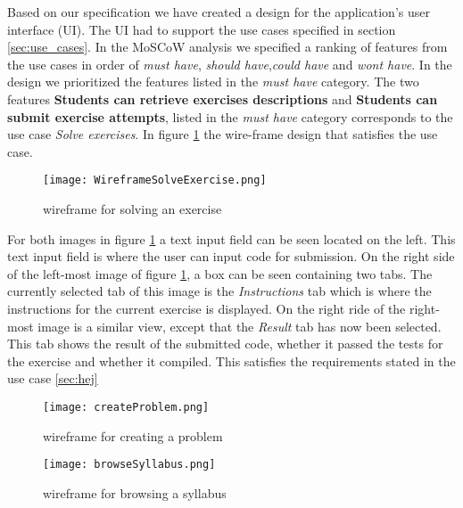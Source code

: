 
Based on our specification we have created a design for the application's user interface (UI). The UI had to support the use cases specified in section \ref*{sec:use_cases}. In the MoSCoW analysis we specified a ranking of features from the use cases in order of \textit{must have}, \textit{should have},\textit{could have} and \textit{wont have}. In the design we prioritized the features listed in the \textit{must have} category. The two features \textbf{Students can retrieve exercises descriptions} and \textbf{Students can submit exercise attempts}, listed in the \textit{must have} category corresponds to the use case \textit{Solve exercises}.
In figure \ref{fig:wfExercise} the wire-frame design that satisfies the use case.
\begin{figure}[H]
	\texttt{[image: WireframeSolveExercise.png]}
	\centering
	\caption{wireframe for solving an exercise}
	\label{fig:wfExercise}
\end{figure}

For both images in figure \ref{fig:wfExercise} a text input field can be seen located on the left. This text input field is where the user can input code for submission. On the right side of the left-most image of figure \ref{fig:wfExercise}, a box can be seen containing two tabs. The currently selected tab of this image is the \textit{Instructions} tab which is where the instructions for the current exercise is displayed. On the right ride of the right-most image is a similar view, except that the \textit{Result} tab has now been selected. This tab shows the result of the submitted code, whether it passed the tests for the exercise and whether it compiled. This satisfies the requirements stated in the use case \ref{sec:hej}
\begin{figure}[H]
	\texttt{[image: createProblem.png]}
	\centering
	\caption{wireframe for creating a problem}
	\label{fig:wfProblem}
\end{figure}

\begin{figure}[H]
	\texttt{[image: browseSyllabus.png]}
	\centering
	\caption{wireframe for browsing a syllabus}
	\label{fig:wfSyllabus}
\end{figure}

